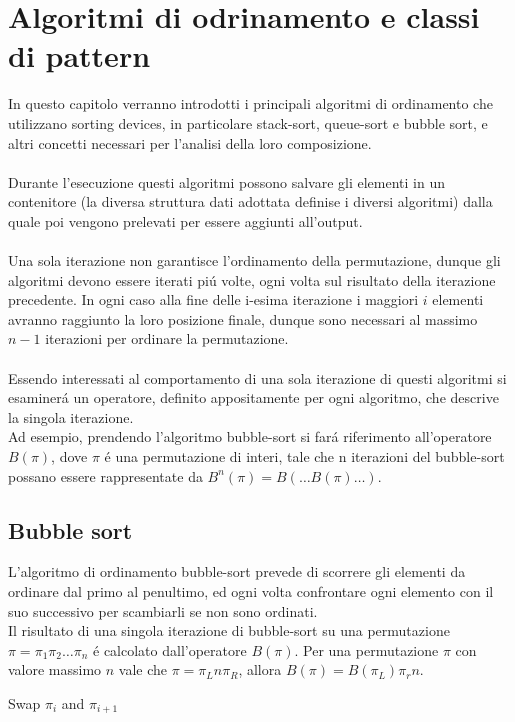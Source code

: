 \chapter{Algoritmi di odrinamento e classi di pattern}
In questo capitolo verranno introdotti i principali algoritmi di ordinamento che utilizzano sorting devices, in particolare stack-sort,
queue-sort e bubble sort, e altri concetti necessari per l'analisi della loro composizione.\\\\
Durante l'esecuzione questi algoritmi possono 
salvare gli elementi in un contenitore (la diversa struttura dati
adottata definise i diversi algoritmi) dalla quale poi vengono prelevati
per essere aggiunti all'output.\\\\
Una sola iterazione non garantisce l'ordinamento della permutazione,
dunque gli algoritmi devono essere iterati pi\'u volte, ogni volta sul risultato della iterazione precedente. In ogni caso alla fine delle i-esima
iterazione i maggiori $i$ elementi avranno raggiunto la loro posizione finale, 
dunque sono necessari al massimo $n-1$ iterazioni per ordinare la permutazione.\\\\
Essendo interessati al comportamento di una sola iterazione di questi
algoritmi si esaminer\'a un operatore, definito appositamente per ogni algoritmo, che descrive la singola iterazione. \\
Ad esempio, prendendo l'algoritmo bubble-sort si far\'a riferimento all'operatore $B(\pi)$, dove $\pi$ \'e una permutazione di
interi, tale che n iterazioni del bubble-sort possano essere rappresentate
da $B^n(\pi) = B(\dots B(\pi)\dots)$.
\section*{Bubble sort}
L'algoritmo di ordinamento bubble-sort prevede di scorrere gli elementi da 
ordinare dal primo al penultimo, ed ogni volta confrontare ogni elemento 
con il suo successivo per scambiarli se non sono ordinati.\\
Il risultato di una singola iterazione di bubble-sort su una permutazione $\pi=\pi_1\pi_2\dots\pi_n$ \'e calcolato dall'operatore $B(\pi)$. Per una permutazione $\pi$ con valore massimo $n$ vale che $\pi = \pi_Ln\pi_R$, allora $B(\pi) = B(\pi_L)\pi_rn$.
\begin{algorithm}[H]
   \caption{$B(\pi)$}
\begin{algorithmic}[1]
   \State Swap $\pi_i$ and $\pi_{i+1}$
   \EndIf
   \EndFor
\end{algorithmic}
\end{algorithm}
